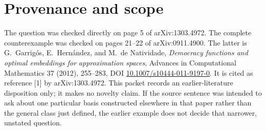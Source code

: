 \documentclass[11pt,a4paper]{article}
\begin{document}
\section{Provenance and scope}

The question was checked directly on page 5 of arXiv:1303.4972.  The complete
counterexample was checked on pages 21--22 of arXiv:0911.4900.  The latter is
G.~Garrig\'os, E.~Hern\'andez, and M.~de Natividade,
\emph{Democracy functions and optimal embeddings for approximation spaces},
Advances in Computational Mathematics 37 (2012), 255--283,
DOI \href{https://doi.org/10.1007/s10444-011-9197-0}{10.1007/s10444-011-9197-0}.
It is cited as reference [1] by arXiv:1303.4972.  This packet records an
earlier-literature disposition only; it makes no novelty claim.  If the
source sentence was intended to ask about one particular basis constructed
elsewhere in that paper rather than the general class just defined, the
earlier example does not decide that narrower, unstated question.
\end{document}
